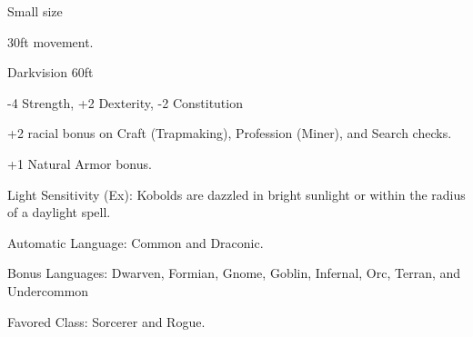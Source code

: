
\begin{itemize*}
\item Small size
\item 30ft movement.
\item Darkvision 60ft
\item -4 Strength, +2 Dexterity, -2 Constitution
\item +2 racial bonus on Craft (Trapmaking), Profession (Miner), and Search checks.
\item +1 Natural Armor bonus.
\item Light Sensitivity (Ex): Kobolds are dazzled in bright sunlight or within the radius of a daylight spell.
\item Automatic Language: Common and Draconic.
\item Bonus Languages: Dwarven, Formian, Gnome, Goblin, Infernal, Orc, Terran, and Undercommon
\item Favored Class: Sorcerer and Rogue.
\end{itemize*}
